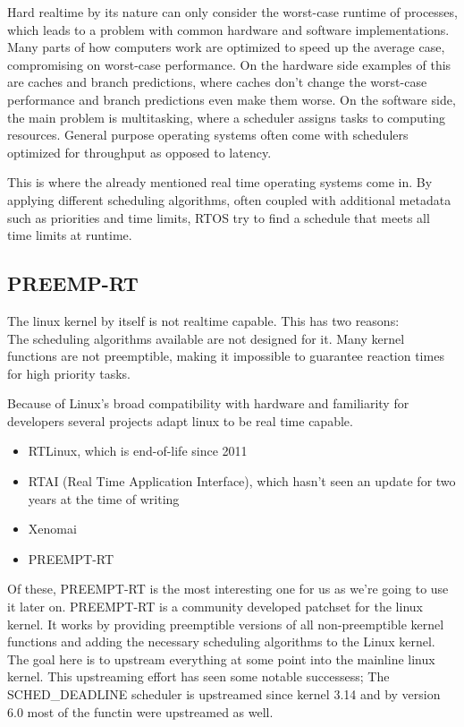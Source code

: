 Hard realtime by its nature can only consider the worst-case runtime of processes,
which leads to a problem with common hardware and software implementations.
Many parts of how computers work are optimized to speed up the average case, compromising on worst-case performance.
On the hardware side examples of this are caches and branch predictions, where caches don't change the worst-case performance and branch predictions even make them worse.
On the software side, the main problem is multitasking, where a scheduler assigns tasks to computing resources.
General purpose operating systems often come with schedulers optimized for throughput as opposed to latency.

This is where the already mentioned real time operating systems come in.
By applying different scheduling algorithms,
often coupled with additional metadata such as priorities and time limits,
RTOS try to find a schedule that meets all time limits at runtime.

\subsection{PREEMP-RT}
\label{sec:background:bm_vs_os:preempt_rt}

The linux kernel by itself is not realtime capable.
This has two reasons:\\
The scheduling algorithms available are not designed for it.
Many kernel functions are not preemptible, making it impossible to guarantee reaction times for high priority tasks.

Because of Linux's broad compatibility with hardware and familiarity for developers several projects adapt linux to be real time capable.
\begin{itemize}
    \item RTLinux, which is end-of-life since 2011
    \item RTAI (Real Time Application Interface), which hasn't seen an update for two years at the time of writing
    \item Xenomai
    \item PREEMPT-RT
\end{itemize}

Of these, PREEMPT-RT is the most interesting one for us as we're going to use it later on.
PREEMPT-RT is a community developed patchset for the linux kernel.
It works by providing preemptible versions of all non-preemptible kernel functions
and adding the necessary scheduling algorithms to the Linux kernel.
The goal here is to upstream everything at some point into the mainline linux kernel.
This upstreaming effort has seen some notable successess;
The SCHED\_DEADLINE scheduler is upstreamed since kernel 3.14 and by version 6.0 most of the functin were upstreamed as well.

